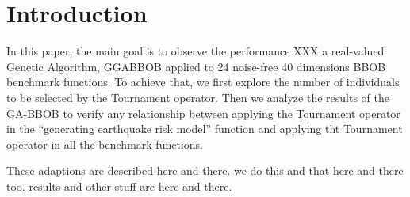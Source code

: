 \section{Introduction}\label{intro}



 In this paper, the main goal is to observe the performance XXX a real-valued Genetic Algorithm, GGABBOB applied to 24 noise-free 40 dimensions BBOB benchmark functions. To achieve that, we first explore the number of individuals to be selected by the Tournament operator. Then we analyze the results of the GA-BBOB to verify any relationship between applying the Tournament operator in the ``generating earthquake risk model'' function and applying tht Tournament operator in all the benchmark functions.


These adaptions are described here and there. we do this and that here and there too. results and other stuff are here and there.